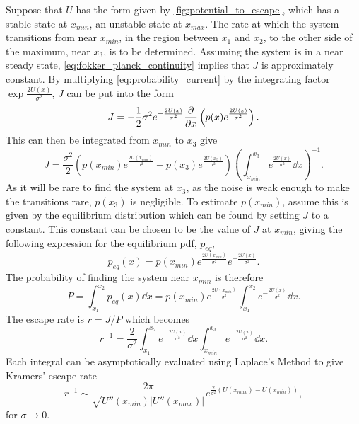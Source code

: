 Suppose that $U$ has the form given by \cref{fig:potential_to_escape}, which has a stable state at $x_{min}$, an unstable state at $x_{max}$. The rate at which the system
transitions from near $x_{min}$, in the region between $x_1$ and $x_2$, to the other side of the maximum, near $x_3$, is to be determined.
Assuming the system is in a near steady state, \cref{eq:fokker_planck_continuity}
implies that $J$ is approximately constant. By multiplying \cref{eq:probability_current} by the integrating factor $\exp \frac{2U(x)}{\sigma^2}$, $J$ can be put into the form
\begin{equation}
  \label{eq:probability_current_other_form}
  J = -\frac{1}{2}\sigma^2 e^{-\frac{2U(x)}{\sigma^2}} \pdv{x} \left( p(x) e^{\frac{2U(x)}{\sigma^2}}\right).
\end{equation}
This can then be integrated from $x_{min}$ to $x_3$ give
\begin{equation}
  \label{eq:integrated_J}
  J = \frac{\sigma^2}{2} \left(p(x_{min})e^{\frac{2U(x_{min})}{\sigma^2}} - p(x_3)e^{\frac{2U(x_{3})}{\sigma^2}}\right)\left(\int_{x_{min}}^{x_{3}} e^{\frac{2U(x)}{\sigma^2}} \dd{x}\right)^{-1}.
\end{equation}
As it will be rare to find the system at $x_3$, as the noise is weak enough to make the transitions rare, $p(x_3)$ is negligible.
To estimate $p(x_{min})$, assume this is given by the equilibrium distribution which can be found by setting $J$ to
a constant. This constant can be chosen to be the value of $J$ at $x_{min}$, giving the following expression for the equilibrium pdf, $p_{eq}$,
\begin{equation}
  \label{eq:equilibrium_pdf}
  p_{eq}(x) = p(x_{min})e^{\frac{2U(x_{min})}{\sigma^2}}e^{-\frac{2U(x)}{\sigma^2}}.
\end{equation}
The probability of finding the system near $x_{min}$ is therefore
\begin{equation}
  \label{eq:p_near_xmin}
  P = \int_{x_1}^{x_2} p_{eq}(x) \dd{x} = p(x_{min})e^{\frac{2U(x_{min})}{\sigma^2}} \int_{x_1}^{x_2} e^{-\frac{2U(x)}{\sigma^2}} \dd{x}.
\end{equation}
The escape rate is $r = J/P$ which becomes
\begin{equation}
  \label{eq:escape_rate_integrals}
  r^{-1} = \frac{2}{\sigma^2} \int_{x_1}^{x_2} e^{-\frac{2U(x)}{\sigma^2}} \dd{x} \int_{x_{min}}^{x_3} e^{-\frac{2U(x)}{\sigma^2}} \dd{x}.
\end{equation}
Each integral can be asymptotically evaluated using Laplace's Method \parencite{Bender1978} to give Kramers' escape rate
\begin{equation}
  \label{eq:kramers}
  r^{-1} \sim \frac{2\pi}{\sqrt{U''(x_{min})|U''(x_{max})|}} e^{\frac{2}{\sigma^2}\left(U(x_{max})-U(x_{min})\right)},
\end{equation}
for $ \sigma \rightarrow 0$.

